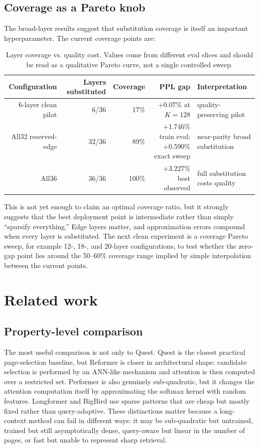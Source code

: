 \documentclass[10pt]{article}
\begin{document}
\subsection{Coverage as a Pareto knob}
The broad-layer results suggest that substitution coverage is itself an
important hyperparameter. The current coverage points are:
\begin{table}[h]
\centering
\caption{Layer coverage vs. quality cost. Values come from different eval
slices and should be read as a qualitative Pareto curve, not a single controlled
sweep.}
\begin{tabular}{rrrrl}
\toprule
Configuration & Layers substituted & Coverage & PPL gap & Interpretation\\
\midrule
6-layer clean pilot & 6/36 & 17\% & +0.07\% at $K=128$ & quality-preserving pilot\\
All32 reserved-edge & 32/36 & 89\% & +1.746\% train eval; +0.590\% exact sweep & near-parity broad substitution\\
All36 & 36/36 & 100\% & +3.227\% best observed & full substitution costs quality\\
\bottomrule
\end{tabular}
\end{table}

This is not yet enough to claim an optimal coverage ratio, but it strongly
suggests that the best deployment point is intermediate rather than simply
``sparsify everything.'' Edge layers matter, and approximation errors compound
when every layer is substituted. The next clean experiment is a coverage
Pareto sweep, for example 12-, 18-, and 20-layer configurations, to test whether
the zero-gap point lies around the 50--60\% coverage range implied by simple
interpolation between the current points.

\section{Related work}
\subsection{Property-level comparison}
The most useful comparison is not only to Quest. Quest is the closest practical
page-selection baseline, but Reformer is closer in architectural shape:
candidate selection is performed by an ANN-like mechanism and attention is then
computed over a restricted set. Performer is also genuinely sub-quadratic, but
it changes the attention computation itself by approximating the softmax kernel
with random features. Longformer and BigBird use sparse patterns that are cheap
but mostly fixed rather than query-adaptive. These distinctions matter because a
long-context method can fail in different ways: it may be sub-quadratic but
untrained, trained but still asymptotically dense, query-aware but linear in the
number of pages, or fast but unable to represent sharp retrieval.
\end{document}
